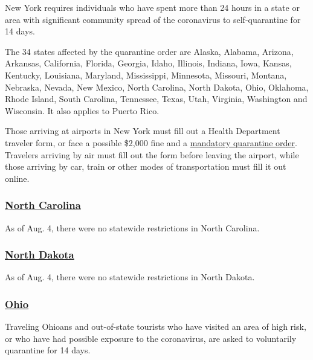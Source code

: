 New York requires individuals who have spent more than 24 hours in a
state or area with significant community spread of the coronavirus to
self-quarantine for 14 days.

The 34 states affected by the quarantine order are Alaska, Alabama,
Arizona, Arkansas, California, Florida, Georgia, Idaho, Illinois,
Indiana, Iowa, Kansas, Kentucky, Louisiana, Maryland, Mississippi,
Minnesota, Missouri, Montana, Nebraska, Nevada, New Mexico, North
Carolina, North Dakota, Ohio, Oklahoma, Rhode Island, South Carolina,
Tennessee, Texas, Utah, Virginia, Washington and Wisconsin. It also
applies to Puerto Rico.

Those arriving at airports in New York must fill out a Health Department
traveler form, or face a possible \$2,000 fine and a
\href{https://forms.ny.gov/s3/Welcome-to-New-York-State-Traveler-Health-Form}{mandatory
quarantine order}. Travelers arriving by air must fill out the form
before leaving the airport, while those arriving by car, train or other
modes of transportation must fill it out online.

\hypertarget{north-carolina}{%
\subsubsection{\texorpdfstring{\href{https://www.nc.gov/covid-19/covid-19-travel-resources}{North
Carolina}}{North Carolina}}\label{north-carolina}}

As of Aug. 4, there were no statewide restrictions in North Carolina.

\hypertarget{north-dakota}{%
\subsubsection{\texorpdfstring{\href{https://www.health.nd.gov/diseases-conditions/coronavirus/travel}{North
Dakota}}{North Dakota}}\label{north-dakota}}

As of Aug. 4, there were no statewide restrictions in North Dakota.

\hypertarget{ohio}{%
\subsubsection{\texorpdfstring{\href{https://coronavirus.ohio.gov/wps/portal/gov/covid-19/home}{Ohio}}{Ohio}}\label{ohio}}

Traveling Ohioans and out-of-state tourists who have visited an area of
high risk, or who have had possible exposure to the coronavirus, are
asked to voluntarily quarantine for 14 days.

